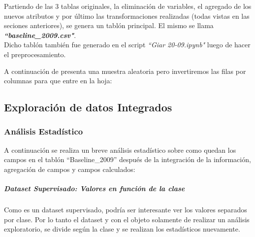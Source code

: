 Partiendo de las 3 tablas originales, la eliminación de variables, el agregado de los nuevos atributos y por último las transformaciones realizadas (todas vistas en las seciones anteriores), se genera un tablón principal. El mismo se llama \textbf{\textit{``baseline\_2009.csv"}}. \\

Dicho tablón también fue generado en el script \textit{``Giar 20-09.ipynb"} luego de hacer el preprocesamiento.

A continuación de presenta una muestra aleatoria pero invertiremos las filas por columnas para que entre en la hoja:







\subsection{Exploración de datos Integrados}

\hypertarget{anuxe1lisis-estaduxedstico}{%
	\subsubsection{Análisis Estadístico}\label{anuxe1lisis-estaduxedstico}}

A continuación se realiza un breve análisis estadístico sobre como
quedan los campos en el tablón ``Baseline\_2009'' después de la
integración de la información, agregación de campos y campos calculados:










\clearpage

\hypertarget{dataset-supervisado-valores-en-funciuxf3n-de-la-clase}{%
	\subparagraph{Dataset Supervisado: Valores en función de la
		clase}\label{dataset-supervisado-valores-en-funciuxf3n-de-la-clase}}

Como es un dataset supervisado, podría ser interesante ver los valores
separados por clase. Por lo tanto el dataset y con el objeto solamente
de realizar un análisis exploratorio, se divide según la clase y se
realizan los estadísticos nuevamente.

